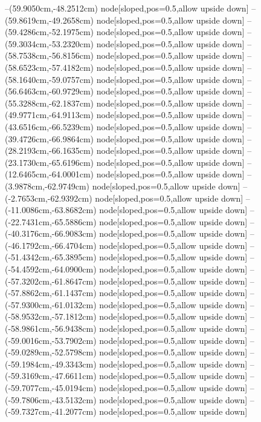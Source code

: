 --(59.9050cm,-48.2512cm) node[sloped,pos=0.5,allow upside down]{\ArrowIn}
--(59.8619cm,-49.2658cm) node[sloped,pos=0.5,allow upside down]{\ArrowIn}
--(59.4286cm,-52.1975cm) node[sloped,pos=0.5,allow upside down]{\ArrowIn}
--(59.3034cm,-53.2320cm) node[sloped,pos=0.5,allow upside down]{\ArrowIn}
--(58.7538cm,-56.8156cm) node[sloped,pos=0.5,allow upside down]{\ArrowIn}
--(58.6523cm,-57.4182cm) node[sloped,pos=0.5,allow upside down]{\arrowIn}
--(58.1640cm,-59.0757cm) node[sloped,pos=0.5,allow upside down]{\ArrowIn}
--(56.6463cm,-60.9729cm) node[sloped,pos=0.5,allow upside down]{\ArrowIn}
--(55.3288cm,-62.1837cm) node[sloped,pos=0.5,allow upside down]{\ArrowIn}
--(49.9771cm,-64.9113cm) node[sloped,pos=0.5,allow upside down]{\ArrowIn}
--(43.6516cm,-66.5239cm) node[sloped,pos=0.5,allow upside down]{\ArrowIn}
--(39.4726cm,-66.9864cm) node[sloped,pos=0.5,allow upside down]{\ArrowIn}
--(28.2193cm,-66.1635cm) node[sloped,pos=0.5,allow upside down]{\ArrowIn}
--(23.1730cm,-65.6196cm) node[sloped,pos=0.5,allow upside down]{\ArrowIn}
--(12.6465cm,-64.0001cm) node[sloped,pos=0.5,allow upside down]{\ArrowIn}
--(3.9878cm,-62.9749cm) node[sloped,pos=0.5,allow upside down]{\ArrowIn}
--(-2.7653cm,-62.9392cm) node[sloped,pos=0.5,allow upside down]{\ArrowIn}
--(-11.0086cm,-63.8682cm) node[sloped,pos=0.5,allow upside down]{\ArrowIn}
--(-22.7431cm,-65.5886cm) node[sloped,pos=0.5,allow upside down]{\ArrowIn}
--(-40.3176cm,-66.9083cm) node[sloped,pos=0.5,allow upside down]{\ArrowIn}
--(-46.1792cm,-66.4704cm) node[sloped,pos=0.5,allow upside down]{\ArrowIn}
--(-51.4342cm,-65.3895cm) node[sloped,pos=0.5,allow upside down]{\ArrowIn}
--(-54.4592cm,-64.0900cm) node[sloped,pos=0.5,allow upside down]{\ArrowIn}
--(-57.3202cm,-61.8647cm) node[sloped,pos=0.5,allow upside down]{\ArrowIn}
--(-57.8862cm,-61.1437cm) node[sloped,pos=0.5,allow upside down]{\arrowIn}
--(-57.9300cm,-61.0132cm) node[sloped,pos=0.5,allow upside down]{\arrowIn}
--(-58.9532cm,-57.1812cm) node[sloped,pos=0.5,allow upside down]{\ArrowIn}
--(-58.9861cm,-56.9438cm) node[sloped,pos=0.5,allow upside down]{\arrowIn}
--(-59.0016cm,-53.7902cm) node[sloped,pos=0.5,allow upside down]{\ArrowIn}
--(-59.0289cm,-52.5798cm) node[sloped,pos=0.5,allow upside down]{\ArrowIn}
--(-59.1984cm,-49.3343cm) node[sloped,pos=0.5,allow upside down]{\ArrowIn}
--(-59.3169cm,-47.6611cm) node[sloped,pos=0.5,allow upside down]{\ArrowIn}
--(-59.7077cm,-45.0194cm) node[sloped,pos=0.5,allow upside down]{\ArrowIn}
--(-59.7806cm,-43.5132cm) node[sloped,pos=0.5,allow upside down]{\ArrowIn}
--(-59.7327cm,-41.2077cm) node[sloped,pos=0.5,allow upside down]{\ArrowIn}

